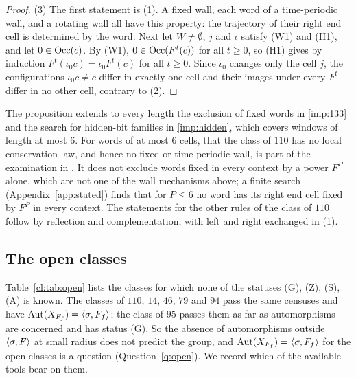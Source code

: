 \begin{proof}
(3) The first statement is (1). A fixed wall, each word of a time-periodic wall, and a rotating wall all have this property: the trajectory of their right end cell is determined by the word. Next let $W\ne\emptyset$, $j$ and $\iota$ satisfy (W1) and (H1), and let $0\in\operatorname{Occ}(c)$. By (W1), $0\in\operatorname{Occ}(F^t(c))$ for all $t\ge0$, so (H1) gives by induction $F^t(\iota_0c)=\iota_0F^t(c)$ for all $t\ge0$. Since $\iota_0$ changes only the cell $j$, the configurations $\iota_0c\ne c$ differ in exactly one cell and their images under every $F^t$ differ in no other cell, contrary to (2).
\end{proof}

The proposition extends to every length the exclusion of fixed words in \eqref{imp:133} and the search for hidden-bit families in \eqref{imp:hidden}, which covers windows of length at most $6$. For words of at most $6$ cells, that the class of $110$ has no local conservation law, and hence no fixed or time-periodic wall, is part of the examination in \cite[Section~4]{Takesue1989}. It does not exclude words fixed in every context by a power $F^P$ alone, which are not one of the wall mechanisms above; a finite search (Appendix~\ref{app:stated}) finds that for $P\le6$ no word has its right end cell fixed by $F^P$ in every context. The statements for the other rules of the class of $110$ follow by reflection and complementation, with left and right exchanged in (1).

\subsection{The open classes}\label{cl:sec:holdouts}

Table~\ref{cl:tab:open} lists the classes for which none of the statuses (G), (Z), (S), (A) is known. The classes of $110$, $14$, $46$, $79$ and $94$ pass the same censuses and have $\operatorname{Aut}(X_{F_f})=\langle\sigma,F_f\rangle$; the class of $95$ passes them as far as automorphisms are concerned and has status (G). So the absence of automorphisms outside $\langle\sigma,F\rangle$ at small radius does not predict the group, and $\operatorname{Aut}(X_{F_f})=\langle\sigma,F_f\rangle$ for the open classes is a question (Question~\ref{q:open}). We record which of the available tools bear on them.

